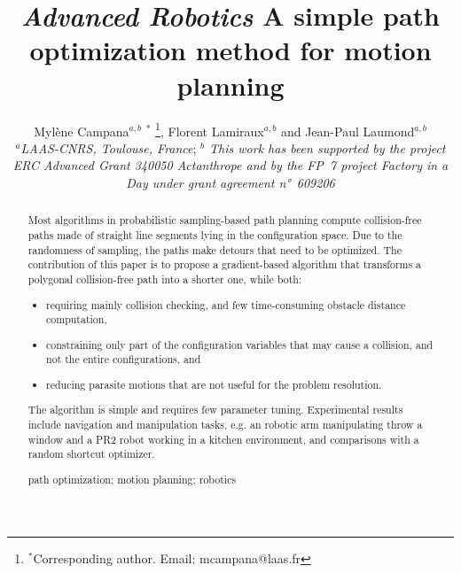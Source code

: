 \documentclass{tADR2e}
\begin{document}
\graphicspath{{images/}}

   


\title{{\itshape Advanced Robotics} A simple path optimization method for motion planning }	

\author{Myl\`{e}ne Campana$^{a,b}$ $^{\ast}$ \thanks{$^\ast$Corresponding author. Email: mcampana@laas.fr}, Florent Lamiraux$^{a,b}$ and Jean-Paul Laumond$^{a,b}$
\\\vspace{6pt}
$^{a}${\em{LAAS-CNRS, Toulouse, France}};
$^{b}${\em{ This work has been supported by the project ERC Advanced Grant 340050 Actanthrope and by the FP~7 project Factory in a Day under grant agreement n°~609206 }}
}
\maketitle

\begin{abstract}
Most algorithms in probabilistic sampling-based path planning compute 
collision-free paths made of straight line segments lying in the configuration 
space. Due
to the randomness of sampling, the paths make detours that need to be optimized.
The contribution of this paper is to propose a gradient-based algorithm that
transforms a polygonal collision-free path into a shorter one, while both:
\begin{itemize}
\item requiring mainly collision checking, and few time-consuming obstacle 
distance computation,
\item constraining only part of the configuration variables that may cause a 
collision, and not the entire configurations, and
\item reducing parasite motions that are not useful for the problem resolution.
\end{itemize}
The algorithm is simple and requires few parameter tuning. Experimental
results include navigation and manipulation tasks, e.g. an robotic arm 
manipulating throw a window and a PR2 robot working in a kitchen environment, 
and comparisons with a random shortcut optimizer.

\medskip

\begin{keywords}path optimization; motion planning; robotics
\end{keywords}\medskip

\end{abstract}
\end{document}
